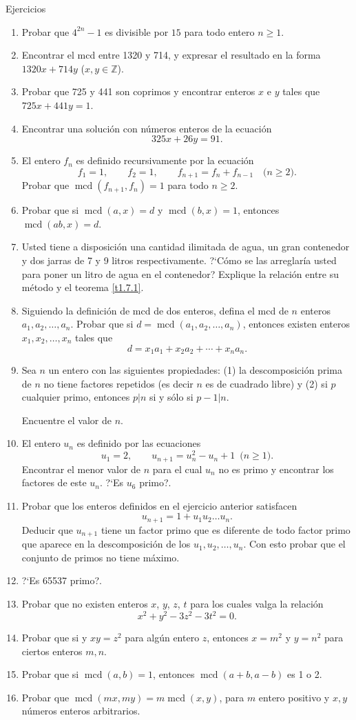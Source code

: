 \documentclass[11pt,spanish,makeidx]{amsbook}
\theoremstyle{definition}
\theoremstyle{remark}
\newcommand \mcd{\operatorname{mcd}}
\begin{document}
\begin{section}{Ejercicios}
\begin{enumerate}
\item Probar que $4^{2n}-1$ es divisible por $15$ para todo entero $n\ge 1$.
\item Encontrar el mcd entre 1320 y 714, y expresar el resultado en la forma $1320x+714y$ ($x,y \in \mathbb Z$).
\item Probar que 725 y 441 son coprimos y encontrar enteros $x$ e $y$ tales que $725x+441y=1$.
\item Encontrar una solución con números enteros de la ecuación
$$ 325x+26y=91.$$
\item El entero $f_n$ es definido recursivamente por la ecuación
$$
f_1=1,\qquad f_2=1, \qquad f_{n+1} = f_n + f_{n-1} \quad
\text{($n\ge 2$)}.
$$
Probar que $\mcd(f_{n+1},f_n)=1$ para todo $n\ge2$.
\item Probar que si $\mcd(a,x)=d$ y $\mcd(b,x)=1$, entonces $\mcd(ab,x)=d$.
\item Usted tiene a disposición una cantidad ilimitada de agua, un gran contenedor y dos jarras de 7 y 9 litros respectivamente. ?`Cómo se las arreglaría usted para poner un litro de agua en el contenedor? Explique la relación entre su método y el teorema \ref{t1.7.1}.
\item Siguiendo la definición de mcd de dos enteros, defina el mcd de $n$ enteros $a_1,a_2,\ldots,a_n$. Probar que si $d=\mcd(a_1,a_2,\ldots,a_n)$, entonces existen enteros $x_1,x_2,\ldots,x_n$ tales que
$$
d=x_1a_1+x_2a_2+\cdots+x_na_n.
$$
\item Sea $n$ un entero con las siguientes propiedades: (1) la descomposición prima de $n$ no tiene factores repetidos (es decir $n$ es de cuadrado libre) y (2) si $p$ cualquier primo, entonces $p|n$ si  y sólo si $p-1|n$.

Encuentre el valor de $n$.
\item El entero $u_n$ es definido por las ecuaciones
$$
u_1=2,\qquad u_{n+1}=u_n^2-u_n+1 \,\,\, \text{($n\ge1$)}.
$$
Encontrar el menor valor de $n$ para el cual $u_n$ no es primo y encontrar los factores de este $u_n$. ?`Es $u_6$ primo?.
\item Probar que los enteros definidos en el ejercicio anterior satisfacen
$$
u_{n+1}= 1 + u_1u_2 \ldots u_n.
$$
Deducir que $u_{n+1}$ tiene un factor primo que es diferente de todo factor primo que aparece en la descomposición de los $u_1,u_2,\ldots,u_n$. Con esto probar que el conjunto de primos no tiene máximo.
\item ?`Es 65537 primo?.
\item Probar que no existen enteros $x$, $y$, $z$, $t$ para los cuales valga la relación
$$
x^2+y^2-3z^2-3t^2=0.
$$
\item Probar que si y $xy=z^2$ para algún entero $z$, entonces $x=m^2$ y $y=n^2$ para ciertos enteros $m,n$.
\item Probar que si $\mcd(a,b)=1$, entonces $\mcd(a+b,a-b)$ es 1 o 2.

\item Probar que   $\mcd(mx,my)= m \mcd(x,y)$, para $m$ entero positivo  y $x,y$ números enteros arbitrarios.
\end{enumerate}
\end{section}
\end{document}
